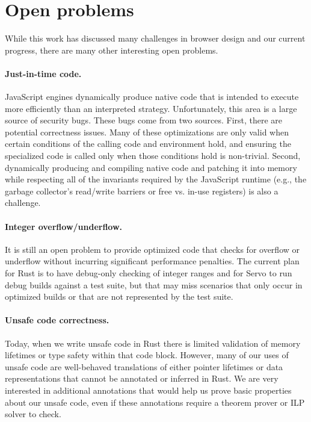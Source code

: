 
\section{Open problems}
\label{sec:open}
While this work has discussed many challenges in browser design and our current progress,
there are many other interesting open problems.

\paragraph{Just-in-time code.} JavaScript engines dynamically produce native code that is
intended to execute more efficiently than an interpreted strategy.
Unfortunately, this area is a large source of security bugs.
These bugs come from two sources.
First, there are potential correctness issues.
Many of these optimizations are only valid when certain conditions of the calling
code and environment hold, and ensuring the specialized code is called only when those
conditions hold is non-trivial.
Second, dynamically producing and compiling native code and patching it into memory
while respecting all of the invariants required by the JavaScript runtime (e.g., the
garbage collector's read/write barriers or free vs. in-use registers) is also a challenge.

\paragraph{Integer overflow/underflow.} It is still an open problem
to provide optimized code that checks for overflow or underflow without
incurring significant performance penalties.
The current plan for Rust is to have debug-only checking of integer ranges
and for Servo to run debug builds against a test suite, but that may miss
scenarios that only occur in optimized builds or that are not represented
by the test suite.

\paragraph{Unsafe code correctness.} Today, when we write unsafe code in Rust
there is limited validation of memory lifetimes or type safety within that
code block.
However, many of our uses of unsafe code are well-behaved translations of
either pointer lifetimes or data representations that cannot be annotated
or inferred in Rust.
We are very interested in additional annotations that would help us prove
basic properties about our unsafe code, even if these annotations require a
theorem prover or ILP solver to check.

